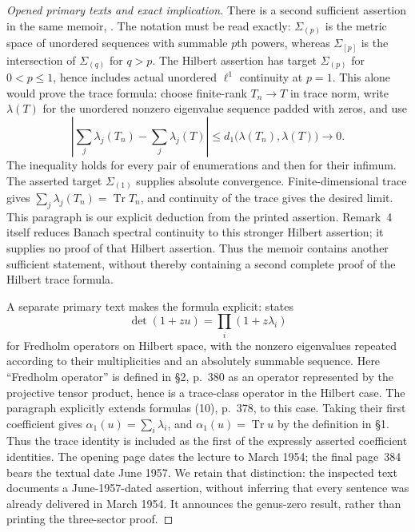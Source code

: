 \begin{proof}[Opened primary texts and exact implication]
There is a second sufficient assertion in the same memoir,
\cite[Chapter II, \S1, no.~4, Remark 4, pp.~20--22, especially p.~21]{Grothendieck1955Memoir}.
The notation must be read exactly: $\Sigma_{(p)}$ is the metric space of
unordered sequences with summable $p$th powers, whereas $\Sigma_{[p]}$
is the intersection of $\Sigma_{(q)}$ for $q>p$. The Hilbert assertion has
target $\Sigma_{(p)}$ for $0<p\leq1$, hence includes actual unordered
$\ell^1$ continuity at $p=1$. This alone would prove the trace formula:
choose finite-rank $T_n\to T$ in trace norm, write $\lambda(T)$ for the
unordered nonzero eigenvalue sequence padded with zeros, and use
\[
 \left|\sum_j\lambda_j(T_n)-\sum_j\lambda_j(T)\right|
 \leq d_1\bigl(\lambda(T_n),\lambda(T)\bigr)\longrightarrow0.
\]
The inequality holds for every pair of enumerations and then for their
infimum. The asserted target $\Sigma_{(1)}$ supplies absolute convergence.
Finite-dimensional trace gives $\sum_j\lambda_j(T_n)=\operatorname{Tr}T_n$,
and continuity of the trace gives the desired limit. This paragraph is
our explicit deduction from the printed assertion. Remark~4 itself
reduces Banach spectral continuity to this stronger Hilbert assertion;
it supplies no proof of that Hilbert assertion. Thus the memoir contains
another sufficient statement, without thereby containing a second
complete proof of the Hilbert trace formula.

A separate primary text makes the formula explicit:
\cite[\S4(c), printed p.~383, formula (24)]{GrothendieckBourbaki91} states
\[
 \det(1+zu)=\prod_i(1+z\lambda_i)
\]
for Fredholm operators on Hilbert space, with the nonzero eigenvalues
repeated according to their multiplicities and an absolutely summable
sequence. Here ``Fredholm operator'' is defined in \S2, p.~380 as an
operator represented by the projective tensor product, hence is a
trace-class operator in the Hilbert case. The paragraph explicitly extends
formulas (10), p.~378, to this case. Taking their first coefficient gives
$\alpha_1(u)=\sum_i\lambda_i$, and $\alpha_1(u)=\operatorname{Tr}u$
by the definition in \S1. Thus the trace identity is included as the
first of the expressly asserted coefficient identities.
The opening page dates the lecture to March 1954; the final page~384
bears the textual date June 1957. We retain that distinction: the
inspected text documents a June-1957-dated assertion, without inferring
that every sentence was already delivered in March 1954. It announces
the genus-zero result, rather than printing the three-sector proof.


\end{proof}
